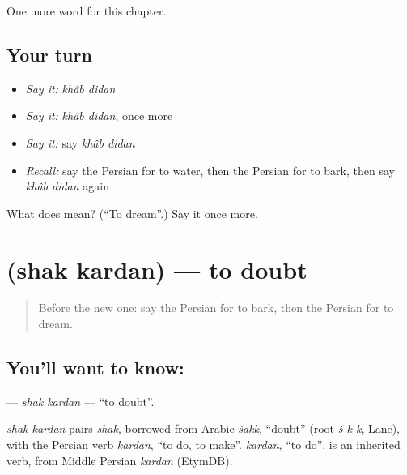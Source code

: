 \begin{grammarlens}[title={What you've built}]
One more word for this chapter.
\end{grammarlens}

\subsection*{Your turn}
\begin{itemize}
\raggedright
  \item \emph{Say it:} \emph{khâb didan}
  \item \emph{Say it:} \emph{khâb didan}, once more
  \item \emph{Say it:} say \emph{khâb didan}
  \item \emph{Recall:} say the Persian for to water, then the Persian for to bark, then say \emph{khâb didan} again
\end{itemize}

\begin{tcolorbox}[breakable,colback=teal!4,colframe=teal!35!black,title={Before you move on}]
What does   mean? (\textquotedblleft{}To dream\textquotedblright{}.) Say it once more.
\end{tcolorbox}
\section[\texorpdfstring{\fa{شک} \fa{کردن} (shak kardan)}{شک کردن (shak kardan)}]{  (shak kardan) — to doubt}

\label{lesson:FA-C222-shak-kardan}



\begin{quote}
Before the new one: say the Persian for to bark, then the Persian for to dream.
\end{quote}

\subsection*{You'll want to know:  }
\textbf{ } — \emph{shak kardan} — \textquotedblleft{}to doubt\textquotedblright{}.

\begin{cousinweb}
\emph{shak kardan} pairs \emph{shak}, borrowed from Arabic \emph{šakk}, \textquotedblleft{}doubt\textquotedblright{} (root \emph{š-k-k}, Lane), with the Persian verb \emph{kardan}, \textquotedblleft{}to do, to make\textquotedblright{}. \emph{kardan}, \textquotedblleft{}to do\textquotedblright{}, is an inherited verb, from Middle Persian \emph{kardan} (EtymDB).
\end{cousinweb}

